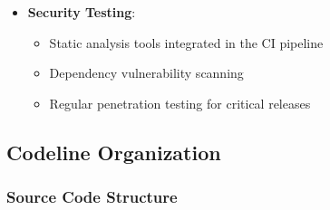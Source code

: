 \begin{itemize}
    \item \textbf{Security Testing}:
    \begin{itemize}
        \item Static analysis tools integrated in the CI pipeline
        \item Dependency vulnerability scanning
        \item Regular penetration testing for critical releases
    \end{itemize}
\end{itemize}





\subsection{Codeline Organization}

\subsubsection{Source Code Structure}

